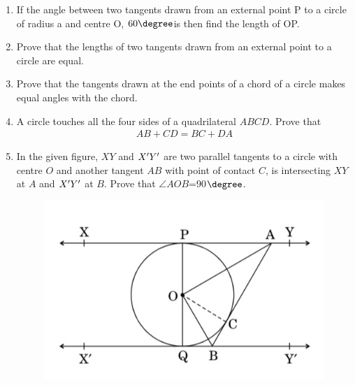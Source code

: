 \begin{enumerate}
\item If the angle between two tangents drawn from an external point P to a circle of radius a and centre O, $60\degree$is then find the length of OP.
\item Prove that the lengths of two tangents drawn from an external point to a circle are equal.
\item Prove that the tangents drawn at the end points of a chord of a circle makes equal angles with the chord.
\item A circle touches all the four sides of a quadrilateral $ABCD$. Prove that 
 \begin{align*}
        AB + CD = BC + DA
 \end{align*}
\item In the given figure, $XY$ and $X\rq Y\rq$ are two parallel tangents to a circle with centre $O$ and another tangent $AB$ with point of contact $C$, is intersecting $XY$ at $A$ and $X\rq Y\rq$ at $B$. Prove that $\angle{AOB}$=90$\degree$.
\begin{figure}[H]
\centering
\includegraphics[width=0.8 \columnwidth]{figs/cir1.jpg}
\end{figure}
\end{enumerate}
